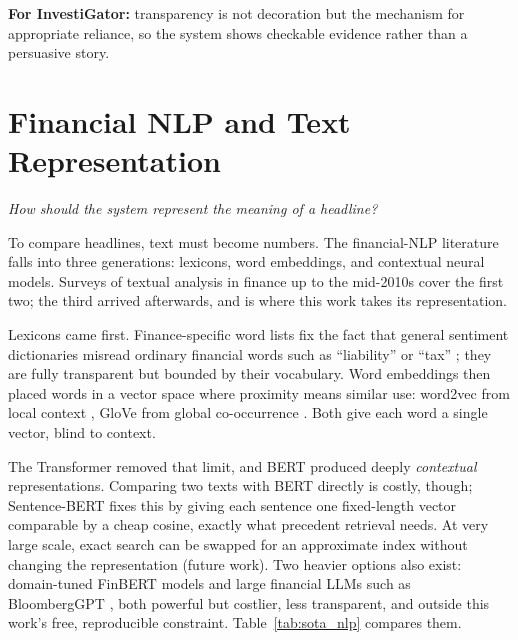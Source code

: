 \textbf{For InvestiGator:} transparency is not decoration but the mechanism for appropriate reliance, so the
system shows checkable evidence rather than a persuasive story.

\section{Financial NLP and Text Representation}
\label{sec:sota_finnlp}

\emph{How should the system represent the meaning of a headline?}

To compare headlines, text must become numbers. The financial-NLP literature falls into three
generations: lexicons, word embeddings, and contextual neural models. Surveys of textual analysis in
finance up to the mid-2010s \autocite{kearney2014textual} cover the first two; the third arrived
afterwards, and is where this work takes its representation.

Lexicons came first. Finance-specific word lists fix the fact that general sentiment dictionaries misread
ordinary financial words such as ``liability'' or ``tax'' \autocite{loughran2011liability}; they are fully
transparent but bounded by their vocabulary. Word embeddings then placed words in a vector space where
proximity means similar use: word2vec from local context \autocite{mikolov2013word2vec}, GloVe from global
co-occurrence \autocite{pennington2014glove}. Both give each word a single vector, blind to context.

The Transformer \autocite{vaswani2017attention} removed that limit, and BERT \autocite{devlin2019bert}
produced deeply \emph{contextual} representations. Comparing two texts with BERT directly is costly, though;
Sentence-BERT \autocite{reimers2019sbert} fixes this by giving each sentence one fixed-length vector
comparable by a cheap cosine, exactly what precedent retrieval needs. At very large scale, exact search can
be swapped for an approximate index \autocite{johnson2021faiss} without changing the representation (future
work). Two heavier options also exist: domain-tuned FinBERT models
\autocite{araci2019finbert, yang2020finbert} and large financial LLMs such as BloombergGPT
\autocite{wu2023bloomberggpt}, both powerful but costlier, less transparent, and outside this work's free,
reproducible constraint. Table~\ref{tab:sota_nlp} compares them.

